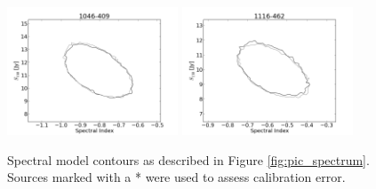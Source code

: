 \documentclass[preprint]{aastex}
\begin{document}
\begin{figure}[htbp]
\begin{center}
\includegraphics[width=2in]{plots/1046-409_SI_MCMC.png} %
\includegraphics[width=2in]{plots/1116-462_SI_MCMC.png} %
\end{center}
\caption{Spectral model contours as described in Figure \ref{fig:pic_spectrum}. Sources marked with a
* were used to assess calibration error.
}\label{fig:SI_contour_2}
\end{figure}
\clearpage
\end{document}
